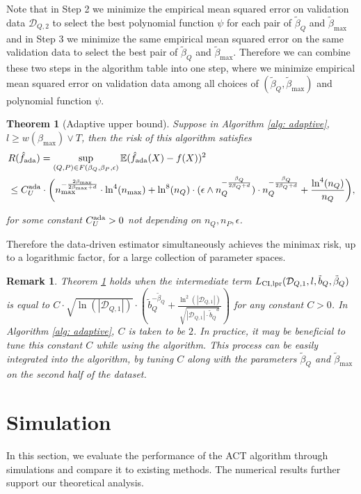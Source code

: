\documentclass{article}
\def\E{\mathbb{E}}
\def\D{\mathcal{D}}
\def\bmax{\beta_{\max}}
\newtheorem{theorem}{Theorem}
\newtheorem{remark}{Remark}
\begin{document}
Note that in Step 2 we minimize the empirical mean squared error on validation data $\D_{Q,2}$ to select the best polynomial function $\psi$ for each pair of $\tilde \beta_Q$ and $\tilde \beta_{\max}$ and in Step 3 we minimize the same empirical mean squared error on the same validation data to select the best pair of $\tilde \beta_Q$ and $\tilde \beta_{\max}$. Therefore we can combine these two steps in the algorithm table into one step, where we minimize empirical mean squared error on validation data among all choices of $(\tilde \beta_Q,\tilde \beta_{\max})$ and polynomial function $\psi$.


\begin{theorem}[Adaptive upper bound]\label{th: adaptive}
Suppose in Algorithm \ref{alg: adaptive}, $l\geq w(\beta_{\max})\vee T$, then the risk of this algorithm satisfies 
\begin{align*}
&R(\hat f_{\rm ada})=\sup_{(Q,P)\in F(\beta_Q,\beta_P,\epsilon)}  \E (\hat f_{\rm ada}(X)-f(X))^2\\
&\leq C_U^{\rm ada}\cdot\bigg( n_{\max}^{-\frac{2\bmax}{2\bmax+d}}\cdot \ln^4(n_{\max})+ \ln^8(n_Q)\cdot(\epsilon \wedge n_Q^{-\frac{\beta_Q}{2\beta_Q+d}})\cdot n_Q^{-\frac{\beta_Q}{2\beta_Q+d}}+\frac{\ln^4(n_Q)}{n_Q}\bigg),    
\end{align*}

for some constant $C_U^{\rm ada}>0$ not depending on $n_Q,n_{P},\epsilon$.
\end{theorem}

Therefore the data-driven estimator simultaneously achieves the minimax risk, up to a logarithmic factor, for a large collection of parameter spaces.

\begin{remark}{\rm
Theorem \ref{th: adaptive} holds when the intermediate term $L_{\rm CI,lpr}(\D_{Q,1},l,\tilde b_Q,\tilde \beta_Q)$ is equal to $C\cdot \sqrt{\ln(|\D_{Q,1}|)}\cdot (\tilde b_Q^{-\tilde \beta_Q}+\frac{\ln^2(|\D_{Q,1}|)}{\sqrt{|\D_{Q,1}|\cdot {\tilde b_Q}^d}})$ for any constant $C>0$.   In Algorithm \ref{alg: adaptive}, $C$ is taken to be $2$. In practice, it may be beneficial to tune this constant $C$ while using the algorithm. This process can be easily integrated into the algorithm, by tuning $C$ along with the parameters $\tilde \beta_Q$ and $\tilde \beta_{\max}$ on the second half of the dataset.
 }\end{remark}

\section{Simulation} 
\label{section: simulation}
In this section, we evaluate the performance of the ACT algorithm through simulations and compare it to existing methods. The numerical results  further support our theoretical analysis. 
\end{document}
